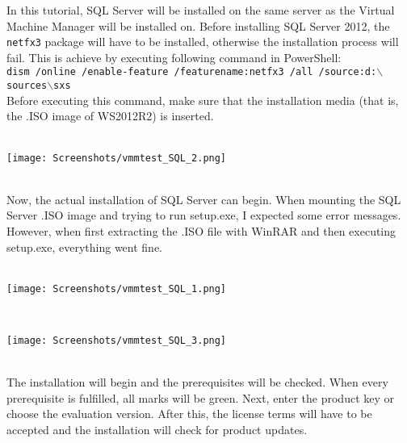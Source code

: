 In this tutorial, SQL Server will be installed on the same server as the Virtual Machine Manager will be installed on. Before installing SQL Server 2012, the \texttt{netfx3} package will have to be installed, otherwise the installation process will fail. This is achieve by executing following command in PowerShell: \\
\texttt{dism /online /enable-feature /featurename:netfx3 /all /source:d:$\backslash$sources$\backslash$sxs} \\
Before executing this command, make sure that the installation media (that is, the .ISO image of WS2012R2) is inserted.
$\;$ \\ \\
\noindent\begin{minipage}{\textwidth}
    \centering
    \texttt{[image: Screenshots/vmmtest\_SQL\_2.png]}
\end{minipage}
$\;$ \\ \\
Now, the actual installation of SQL Server can begin. When mounting the SQL Server .ISO image and trying to run setup.exe, I expected some error messages. However, when first extracting the .ISO file with WinRAR and then executing setup.exe, everything went fine. 
$\;$ \\ \\
\noindent\begin{minipage}{\textwidth}
    \centering
     \texttt{[image: Screenshots/vmmtest\_SQL\_1.png]}
\end{minipage}
$\;$ \\ \\
\noindent\begin{minipage}{\textwidth}
    \centering
     \texttt{[image: Screenshots/vmmtest\_SQL\_3.png]}
\end{minipage}
$\;$ \\ \\
The installation will begin and the prerequisites will be checked. When every prerequisite is fulfilled, all marks will be green. Next, enter the product key or choose the evaluation version. After this, the license terms will have to be accepted and the installation will check for product updates.

